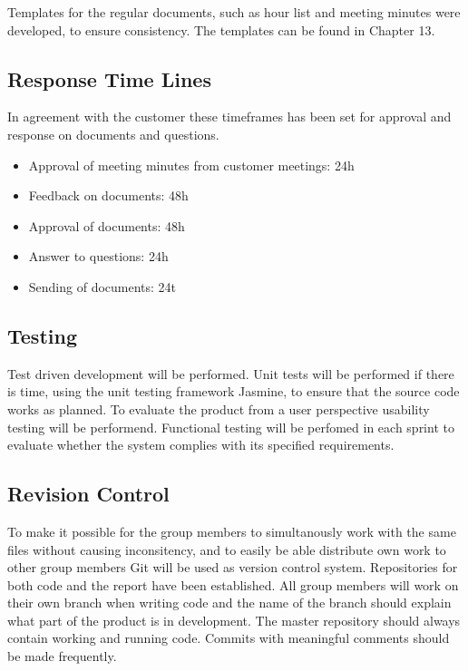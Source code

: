 Templates for the regular documents, such as hour list and meeting minutes were developed, to ensure consistency. The templates can be found in Chapter 13.

\subsection{Response Time Lines}

In agreement with the customer these timeframes has been set for approval and response on documents and questions.

\begin{itemize}
	\item Approval of meeting minutes from customer meetings: 24h
	\item Feedback on documents: 48h
	\item Approval of documents: 48h
	\item Answer to questions: 24h
	\item Sending of documents: 24t
\end{itemize}

\subsection{Testing}

Test driven development will be performed. Unit tests will be performed if there is time, using the unit testing framework Jasmine, to ensure that the source code works as planned. To evaluate the product from a user perspective usability testing will be performend. Functional testing will be perfomed in each sprint to evaluate whether the system complies with its specified requirements.

\subsection{Revision Control}

To make it possible for the group members to simultanously work with the same files without causing inconsitency, and to easily be able distribute own work to other group members Git will be used as version control system. Repositories for both code and the report have been established. All group members will work on their own branch when writing code and the name of the branch should explain what part of the product is in development. The master repository should always contain working and running code. Commits with meaningful comments should be made frequently.

